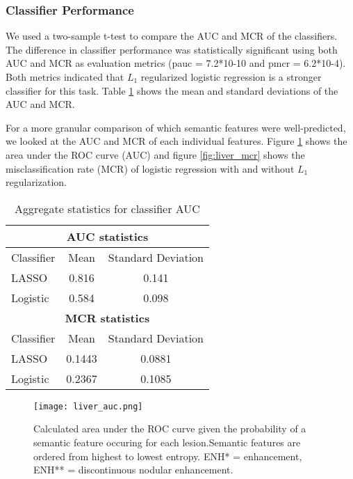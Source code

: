 
\subsubsection{Classifier Performance}

We used a two-sample t-test to compare the AUC and MCR of the classifiers. The difference in classifier performance was statistically significant using both AUC and MCR as evaluation metrics (pauc = 7.2*10-10 and pmcr = 6.2*10-4). Both metrics indicated that $L_1$ regularized logistic regression is a stronger classifier for this task. Table \ref{table:liver_auc_mcr} shows the mean and standard deviations of the AUC and MCR.

For a more granular comparison of which semantic features were well-predicted, we looked at the AUC and MCR of each individual features. Figure \ref{fig:liver_auc} shows the area under the ROC curve (AUC) and figure \ref{fig:liver_mcr} shows the misclassification rate (MCR) of logistic regression with and without $L_1$ regularization.

\begin{table}[h!]
	\centering
	\begin{tabular}{|l|c|c|}
		\hline
		\multicolumn{3}{|c|}{\textbf{AUC statistics}} \\ \hline
		Classifier & Mean & Standard Deviation\\ 
		\hline
		LASSO & 0.816 & 0.141 \\ 
		\hline 
		Logistic & 0.584 & 0.098 \\ 
		\hline \hline
		\multicolumn{3}{|c|}{\textbf{MCR statistics} }\\ 
		\hline
		Classifier & Mean & Standard Deviation\\ 
		\hline
		LASSO & 0.1443 & 0.0881 \\ 
		\hline 
		Logistic & 0.2367 & 0.1085 \\ 
		\hline 
	\end{tabular}
	\caption{Aggregate statistics for classifier AUC}
	\label{table:liver_auc_mcr}
\end{table}


\begin{figure}
	\centering
	\texttt{[image: liver\_auc.png]}
	\caption[AUC results for liver annotation]{Calculated area under the ROC curve given the probability of a semantic feature occuring for each lesion.Semantic features are ordered from highest to lowest entropy. ENH* = enhancement, ENH** = discontinuous nodular enhancement.}
	\label{fig:liver_auc}
\end{figure}


